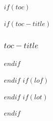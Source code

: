 $if(toc)$
\begin{frame}
$if(toc-title)$
  \frametitle{$toc-title$}
$endif$
  \tableofcontents[hideallsubsections]
\end{frame}
$endif$
$if(lof)$
\listoffigures
$endif$
$if(lot)$
\listoftables
$endif$
